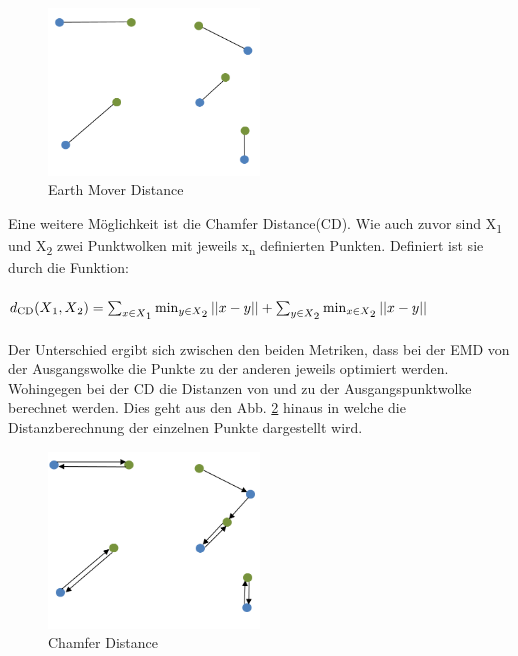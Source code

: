 \documentclass{llncs}
\begin{document}
\begin{figure}[htbp] 
	\centering
	\includegraphics[width=0.5\textwidth]{emd_distance.png}
	\caption{Earth Mover Distance}
	\label{fig:Bild14}
\end{figure}
		
Eine weitere Möglichkeit ist die Chamfer Distance(CD). Wie auch zuvor sind  X\textsubscript{1} und X\textsubscript{2} zwei Punktwolken mit jeweils x\textsubscript{n} definierten Punkten\cite{autoencoderloss}. Definiert ist sie durch die Funktion:
\\\\
\begin{math}
d\textsubscript{CD}(X\textsubscript{1},X\textsubscript{2})=\sum_{x\in X\textsubscript{1}} \min_{y \in X\textsubscript{2}}||x-y|| + \sum_{y\in X\textsubscript{2}} \min_{x \in X\textsubscript{2}}||x-y||
\end{math}
\\\\
Der Unterschied ergibt sich zwischen den beiden Metriken, dass bei der EMD von der Ausgangswolke die Punkte zu der anderen jeweils optimiert werden. Wohingegen bei der CD die Distanzen von und zu der Ausgangspunktwolke berechnet werden. Dies geht aus den Abb. \ref{fig:Bild15} hinaus in welche die Distanzberechnung der einzelnen Punkte dargestellt wird\cite{autoencoderloss}.

\begin{figure}[htbp] 
	\centering
	\includegraphics[width=0.5\textwidth]{champfer.png}
	\caption{Chamfer Distance}
	\label{fig:Bild15}
\end{figure} 
\newpage
\end{document}
